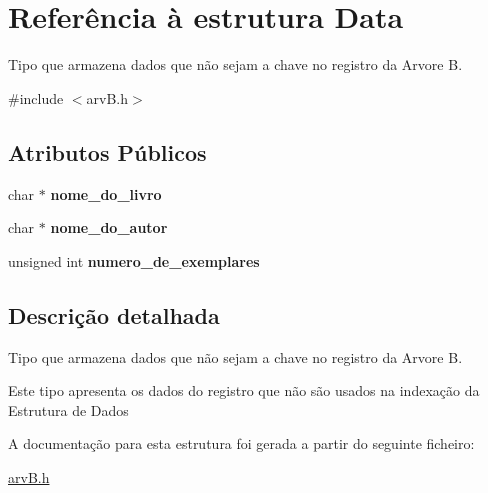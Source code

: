\hypertarget{structData}{}\section{Referência à estrutura Data}
\label{structData}


Tipo que armazena dados que não sejam a chave no registro da Arvore B.  




{\ttfamily \#include $<$arv\+B.\+h$>$}

\subsection*{Atributos Públicos}
\begin{DoxyCompactItemize}
\item 
\mbox{\label{structData_a872aeb66bac30d17c6fa5173b1386d5a}} 
char $\ast$ {\bfseries nome\+\_\+do\+\_\+livro}
\item 
\mbox{\label{structData_a7da3274c4a0938ef6cfcf6367034a622}} 
char $\ast$ {\bfseries nome\+\_\+do\+\_\+autor}
\item 
\mbox{\label{structData_a21a380972eb50494eb2d54bdf47e2901}} 
unsigned int {\bfseries numero\+\_\+de\+\_\+exemplares}
\end{DoxyCompactItemize}


\subsection{Descrição detalhada}
Tipo que armazena dados que não sejam a chave no registro da Arvore B. 

Este tipo apresenta os dados do registro que não são usados na indexação da Estrutura de Dados 

A documentação para esta estrutura foi gerada a partir do seguinte ficheiro\+:\begin{DoxyCompactItemize}
\item 
\hyperlink{arvB_8h}{arv\+B.\+h}\end{DoxyCompactItemize}

